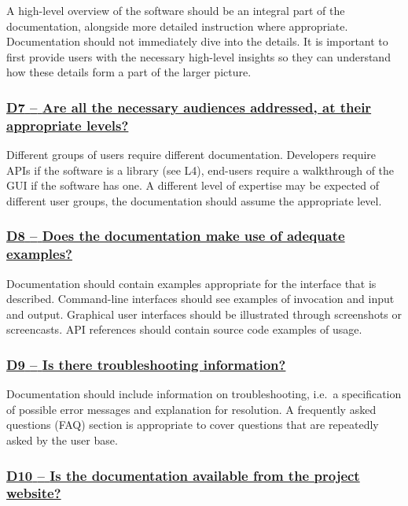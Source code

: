 \documentclass[a4paper,11pt]{article}
\newcommand{\criterion}[1]{\subsubsection*{\underline{#1}}}
\begin{document}
A high-level overview of the software should be an integral part of the
documentation, alongside more detailed instruction where appropriate.
Documentation should not immediately dive into the details. It is important to
first provide users with the necessary high-level insights so they can understand how
these details form a part of the larger picture.


\newcommand{\dSevenID}{D7}
\newcommand{\dSevenText}{Are all the necessary audiences addressed, at their appropriate levels?}
\criterion{\dSevenID{ }--{ }\dSevenText}\label{id:d7}

Different groups of users require different documentation. Developers require
APIs if the software is a library (see L4), end-users require a walkthrough of the GUI
if the software has one. A different level of expertise may be expected of
different user groups, the documentation should assume the appropriate level.

\newcommand{\dEightID}{D8}
\newcommand{\dEightText}{Does the documentation make use of adequate examples?}
\criterion{\dEightID{ }--{ }\dEightText}\label{id:d8}

Documentation should contain examples appropriate for the interface that is
described. Command-line interfaces should see examples of invocation and input
and output. Graphical user interfaces should be illustrated through screenshots or
screencasts. API references should contain source code examples of usage.

\newcommand{\dNineID}{D9}
\newcommand{\dNineText}{Is there troubleshooting information?}
\criterion{\dNineID{ }--{ }\dNineText}\label{id:d9}

Documentation should include information on troubleshooting, i.e.\ a
specification of possible error messages and explanation for resolution. A
frequently asked questions (FAQ) section is appropriate to cover questions
that are repeatedly asked by the user base.

\newcommand{\dTenID}{D10}
\newcommand{\dTenText}{Is the documentation available from the project website?}
\criterion{\dTenID{ }--{ }\dTenText}\label{id:d10}
\end{document}
